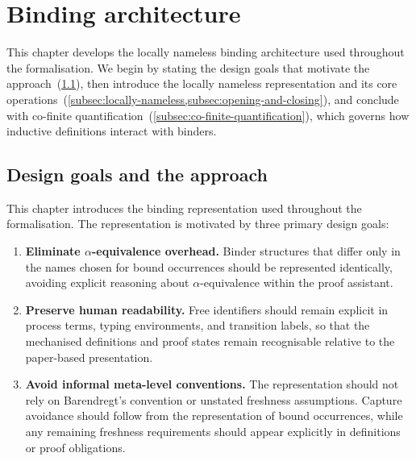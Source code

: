 \section{Binding architecture}\label{sec:binding-architecture}
This chapter develops the locally nameless binding architecture used 
throughout the formalisation. We begin by stating the design goals that 
motivate the approach~(\cref{subsec:design-goals}), then introduce the 
locally nameless representation and its core operations~(\cref{subsec:locally-nameless,subsec:opening-and-closing}), and conclude with co-finite quantification~(\cref{subsec:co-finite-quantification}), which governs how inductive definitions interact with binders.

\subsection{Design goals and the approach}\label{subsec:design-goals} %
This chapter introduces the binding representation used throughout the formalisation. The representation is motivated by three primary design goals:

\begin{enumerate}
  \item \textbf{Eliminate $\alpha$-equivalence overhead.} Binder structures that differ only in the names chosen for bound occurrences should be represented identically, avoiding explicit reasoning about $\alpha$-equivalence within the proof assistant.
  \item \textbf{Preserve human readability.} Free identifiers should remain explicit in process terms, typing environments, and transition labels, so that the mechanised definitions and proof states remain recognisable relative to the paper-based presentation.
  \item \textbf{Avoid informal meta-level conventions.} The representation should not rely on Barendregt's convention or unstated freshness assumptions. Capture avoidance should follow from the representation of bound occurrences, while any remaining freshness requirements should appear explicitly in definitions or proof obligations.
\end{enumerate}

